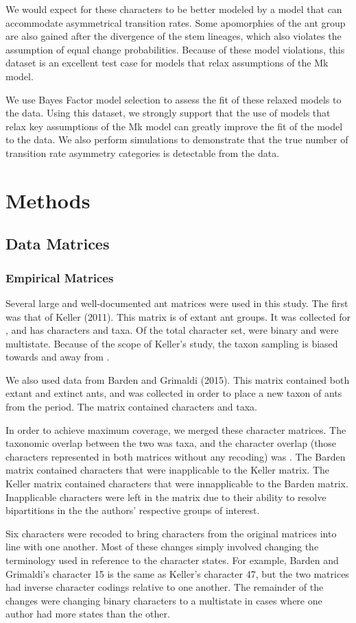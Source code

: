 \documentclass[]{article}
\begin{document}
We would expect for these characters to be better modeled by a model that can accommodate asymmetrical transition rates.
Some apomorphies of the ant group are also gained after the divergence of the stem lineages, which also violates the assumption of equal change probabilities.
Because of these model violations, this dataset is an excellent test case for models that relax assumptions of the Mk model. \par
We use Bayes Factor model selection to assess the fit of these relaxed models to the data.
Using this dataset, we strongly support that the use of models that relax key assumptions of the Mk model can greatly improve the fit of the model to the data.
We also perform simulations to demonstrate that the true number of transition rate asymmetry categories is detectable from the data.

\section{Methods}


\subsection{Data Matrices}
\subsubsection{Empirical Matrices}
Several large and well-documented ant matrices were used in this study.
The first was that of Keller (2011). 
This matrix is of extant ant groups. 
It was collected for , and has characters and taxa.
Of the total character set, were binary and were multistate.
Because of the scope of Keller's study, the taxon sampling is biased towards and away from . \par
We also used data from Barden and Grimaldi (2015). 
This matrix contained both extant and extinct ants, and was collected in order to place a new taxon of ants from the period.
The matrix contained characters and taxa. \par

In order to achieve maximum coverage, we merged these character matrices.
The taxonomic overlap between the two was taxa, and the character overlap (those characters represented in both matrices without any recoding) was .
The Barden matrix contained characters that were inapplicable to the Keller matrix.
The Keller matrix contained characters that were innapplicable to the Barden matrix.
Inapplicable characters were left in the matrix due to their ability to resolve bipartitions in the the authors' respective groups of interest. \par
Six characters were recoded to bring characters from the original matrices into line with one another.
Most of these changes simply involved changing the terminology used in reference to the character states.
For example, Barden and Grimaldi's character 15 is the same as Keller's character 47, but the two matrices had inverse character codings relative to one another.
The remainder of the changes were changing binary characters to a multistate in cases where one author had more states than the other. \par
\end{document}
